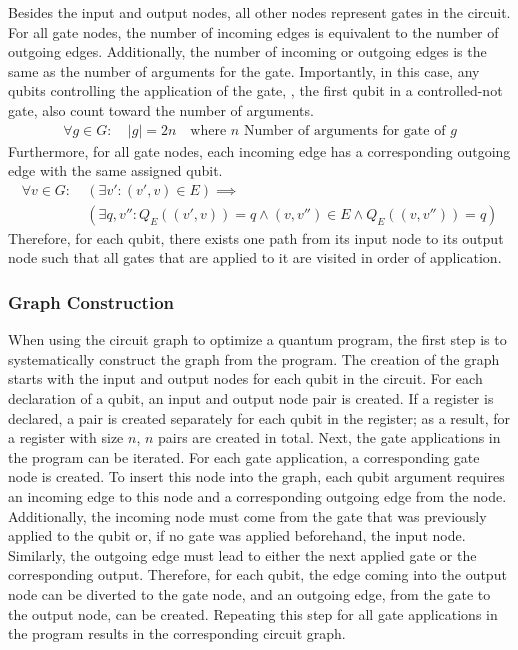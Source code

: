 Besides the input and output nodes, all other nodes represent gates in the circuit. For all gate nodes, the number of incoming edges is equivalent to the number of outgoing edges. Additionally, the number of incoming or outgoing edges is the same as the number of arguments for the gate. 
Importantly, in this case, any qubits controlling the application of the gate, \eg, the first qubit in a controlled-not gate, also count toward the number of arguments.
\begin{align*}
    \forall g \in G :\ & |g| = 2n \quad \text{where } n \text{ Number of arguments for gate of } g
\end{align*}
Furthermore, for all gate nodes, each incoming edge has a corresponding outgoing edge with the same assigned qubit.
\begin{align*}
    \forall v \in G :\ & (\exists v': (v', v) \in E) \implies\\
    & (\exists q, v'' : Q_E((v', v)) = q \land (v, v'') \in E \land Q_E((v, v'')) = q)
\end{align*}
Therefore, for each qubit, there exists one path from its input node to its output node such that all gates that are applied to it are visited in order of application.

\subsubsection{Graph Construction}
When using the circuit graph to optimize a quantum program, the first step is to systematically construct the graph from the program. The creation of the graph starts with the input and output nodes for each qubit in the circuit. For each declaration of a qubit, an input and output node pair is created. If a register is declared, a pair is created separately for each qubit in the register; as a result, for a register with size $n$, $n$ pairs are created in total. Next, the gate applications in the program can be iterated. For each gate application, a corresponding gate node is created. To insert this node into the graph, each qubit argument requires an incoming edge to this node and a corresponding outgoing edge from the node. Additionally, the incoming node must come from the gate that was previously applied to the qubit or, if no gate was applied beforehand, the input node. Similarly, the outgoing edge must lead to either the next applied gate or the corresponding output. Therefore, for each qubit, the edge coming into the output node can be diverted to the gate node, and an outgoing edge, from the gate to the output node, can be created. Repeating this step for all gate applications in the program results in the corresponding circuit graph.

